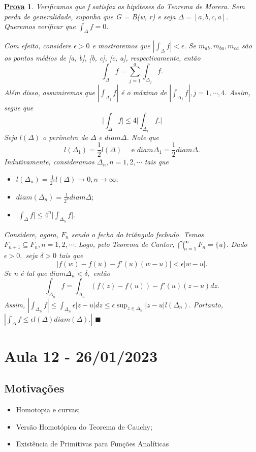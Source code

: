 \documentclass{article}
\newtheorem*{proof*}{\underline{Prova}}
\renewcommand\qedsymbol{$\blacksquare$}
\begin{document}
\begin{proof*}
  Verificamos que f satisfaz as hip\'oteses do Teorema de Morera. 
Sem perda de generalidade, suponha que G = B(w, r) e seja $\Delta=[a, b, c, a].$
Queremos verificar que $\int_{\Delta}^{}f = 0.$
  
  Com efeito, considere $\epsilon > 0$ e mostraremos que $|\int_{\Delta}^{}f| < \epsilon.$ Se 
  $m_{ab}, m_{ba}, m_{ca}$ s\~ao os pontos m\'edios de [a, b], [b, c], [c, a], respectivamente, 
ent\~ao
  $$
    \int_{\Delta}^{}f = \sum\limits_{j=1}^{a}\int_{\Delta_{j}}^{}f.
  $$
  Al\'em disso, assumiremos que $|\int_{\Delta_j}^{}f|$ \'e o m\'aximo de 
 $|\int_{\Delta_{j}}^{}f|, j = 1, \cdots, 4$. Assim, segue que 
  $$
  \biggl|\int_{\Delta}^{}f\biggr|\leq4 \biggl|\int_{\Delta_{1}}^{}f.\biggr|
  $$
  Seja $l(\Delta)$ o per\'imetro de $\Delta$ e $diam \Delta$. Note que 
  $$
  l(\Delta_{1}) = \frac{1}{2}l(\Delta)\quad\text{ e } diam \Delta_{1} = \frac{1}{2}diam \Delta.
  $$
  Indutivamente, consideramos $\Delta_{n}, n = 1, 2, \cdots$ tais que
  \begin{itemize}
    \item[1)] $l(\Delta_{n}) = \frac{1}{2^n}l(\Delta)\to0, n\to\infty;$
    \item[2)] $diam(\Delta_{n}) = \frac{1}{2^n}diam \Delta;$
    \item[3)] $\biggl|\int_{\Delta}^{}f\biggr|\leq 4^n\biggl|\int_{\Delta_{n}}^{}f\biggr|.$
  \end{itemize}
  Considere, agora, $F_{n}$ sendo o fecho do tri\^angulo fechado. Temos 
  $F_{n+1}\subseteq{F_{n}}, n=1, 2, \cdots.$ Logo, pelo Teorema de Cantor, $\bigcap_{n=1}^{\infty}F_{n}=\{u\}. $
  Dado $\epsilon > 0,$ seja $\delta > 0$ tais que 
  $$
    |f(w) - f(u) - f'(u)(w-u)| < \epsilon|w-u|.
  $$
  Se n \'e tal que $diam \Delta_{n} < \delta,$ ent\~ao
  $$
    \int_{\Delta_{n}}^{}f = \int_{\Delta_{n}}^{}(f(z) - f(u)) - f'(u)(z-u)dz.
  $$
  Assim, $|\int_{\Delta_{n}}^{}f|\leq \int_{\Delta_{n}}^{}\epsilon|z-u|dz\leq \epsilon\sup_{z\in{\Delta_{n}}}|z-u|l(\Delta_{n}).$
  Portanto, $|\int_{\Delta}^{}f \leq \epsilon l(\Delta) diam(\Delta).|$ \qedsymbol
\end{proof*}
\newpage

\section{Aula 12 - 26/01/2023}
\subsection{Motiva\c c\~oes}
\begin{itemize}
  \item Homotopia e curvas;
  \item Vers\~ao Homot\'opica do Teorema de Cauchy;
  \item Exist\^encia de Primitivas para Fun\c c\~oes Anal\'iticas 
\end{itemize}
\end{document}
